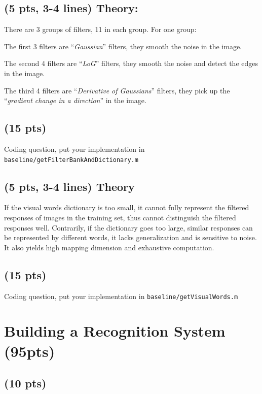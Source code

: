 \documentclass[12pt]{article}
\newcounter{list}
\begin{document}
\subsection{(5 pts, 3-4 lines) Theory:}

There are 3 groups of filters, 11 in each group. For one group:

The first 3 filters are ``\emph{Gaussian}'' filters, they smooth the noise in the image.

The second 4 filters are ``\emph{LoG}'' filters, they smooth the noise and detect the edges in the image.

The third 4 filters are ``\emph{Derivative of Gaussians}'' filters, they pick up the ``\emph{gradient change in a direction}'' in the image.

\subsection{(15 pts)}

Coding question, put your implementation in \verb+baseline/getFilterBankAndDictionary.m+



\subsection{(5 pts, 3-4 lines) Theory}
If the visual words dictionary is too small, it cannot fully represent the filtered responses of images in the training set, thus cannot distinguish the filtered responses well. Contrarily, if the dictionary goes too large, similar responses can be represented by different words, it lacks generalization and is sensitive to noise. It also yields high mapping dimension and exhaustive computation.

\subsection{(15 pts)}

Coding question, put your implementation in \verb+baseline/getVisualWords.m+



\section{Building a Recognition System (95pts)}

\subsection{(10 pts)}
\end{document}
